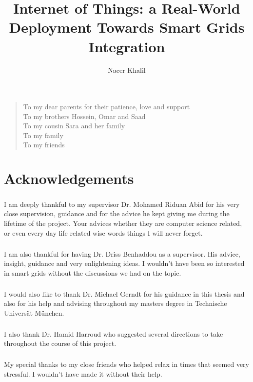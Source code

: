 \documentclass[oneside,12pt,a4paper,final]{book}
\author{Nacer Khalil}
\title{Internet of Things: a Real-World Deployment Towards Smart Grids Integration}
\newenvironment{dedication}{\vspace{6ex}\begin{quotation}\begin{center}\begin{em}}{\par\end{em}\end{center}\end{quotation}}
\begin{document}
\doublespacing

\frontmatter


\chapter{} %
\begin{dedication}
To my dear parents for their patience, love and support \\
To my brothers Hossein, Omar and Saad \\
To my cousin Sara and her family \\
To my family \\
To my friends \\

\end{dedication}
\chapter{Acknowledgements}
\paragraph{}
I am deeply thankful to my supervisor Dr. Mohamed Riduan Abid for his very close supervision, guidance and for the advice he kept giving me during the lifetime of the project. Your advices whether they are computer science related, or even every day life related wise words things I will never forget.
\paragraph*{}
I am also thankful for having Dr. Driss Benhaddou as a supervisor. His advice, insight, guidance and very enlightening ideas. I wouldn't have been so interested in smart grids without the discussions we had on the topic.
\paragraph{}
I would also like to thank Dr. Michael Gerndt for his guidance in this thesis and also for his help and advising throughout my masters degree in Technische Universät München.
\paragraph{}
I  also thank Dr. Hamid Harroud who suggested several directions to take throughout the course of this project.
\paragraph{}
My special thanks to my close friends who helped relax in times that seemed very stressful. I wouldn't have made it without their help.
\end{document}
